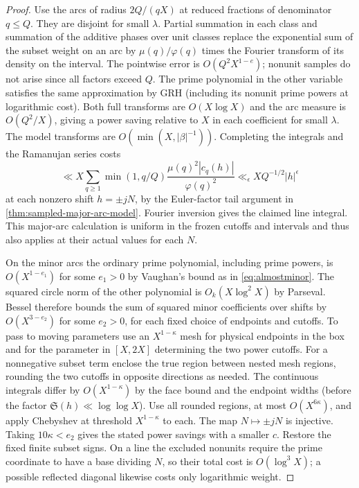 \documentclass[11pt,a4paper]{article}
\numberwithin{equation}{section}
\newcommand{\SSS}{\mathfrak S}
\begin{document}
\begin{proof}
Use the arcs of radius $2Q/(qX)$ at reduced fractions of
denominator $q\le Q$. They are disjoint for small $\lambda$.
Partial summation in each class and summation of the additive
phases over unit classes replace the exponential sum of the subset weight
on an arc by $\mu(q)/\varphi(q)$ times the Fourier transform
of its density on the interval. The pointwise error is
$O(Q^2 X^{1-e})$; nonunit samples do not arise since all
factors exceed $Q$. The prime polynomial in the other variable
satisfies the same approximation by GRH (including its
nonunit prime powers at logarithmic cost). Both full transforms
are $O(X\log X)$ and the arc measure is $O(Q^2/X)$, giving a
power saving relative to $X$ in each coefficient for small
$\lambda$. The model transforms are
$O(\min(X,|\beta|^{-1}))$. Completing the integrals and the
Ramanujan series costs
\[
 \ll X\sum_{q\ge1}\min(1,q/Q)
               \frac{\mu(q)^2|c_q(h)|}{\varphi(q)^2}
 \ll_\epsilon XQ^{-1/2}|h|^\epsilon
\]
at each nonzero shift $h=\pm jN$, by the Euler-factor tail
argument in \cref{thm:sampled-major-arc-model}. Fourier
inversion gives the claimed line integral. This major-arc
calculation is uniform in the frozen cutoffs and intervals
and thus also applies at their actual values for each $N$.

On the minor arcs the ordinary prime polynomial, including
prime powers, is $O(X^{1-e_1})$ for some $e_1>0$ by Vaughan's
bound as in \eqref{eq:almostminor}. The squared circle norm
of the other polynomial is $O_k(X\log^2 X)$ by Parseval.
Bessel therefore bounds the sum of squared minor coefficients
over shifts by $O(X^{3-e_2})$ for some $e_2>0$, for each
fixed choice of endpoints and cutoffs. To pass to moving
parameters use an $X^{1-\kappa}$ mesh for physical endpoints
in the box and for the parameter in $[X,2X]$ determining
the two power cutoffs. For a nonnegative subset term enclose
the true region between nested mesh regions, rounding the
two cutoffs in opposite directions as needed. The continuous
integrals differ by $O(X^{1-\kappa})$ by the face bound and
the endpoint widths (before the factor $\SSS(h)\ll\log\log X$).
Use all rounded regions, at most $O(X^{6\kappa})$, and apply
Chebyshev at threshold $X^{1-\kappa}$ to each. The map
$N\mapsto\pm jN$ is injective. Taking $10\kappa<e_2$ gives
the stated power savings with a smaller $c$. Restore the fixed
finite subset signs. On a line the excluded nonunits require
the prime coordinate to have a base dividing $N$, so their
total cost is $O(\log^3 X)$; a possible reflected diagonal
likewise costs only logarithmic weight.
\end{proof}
\end{document}
